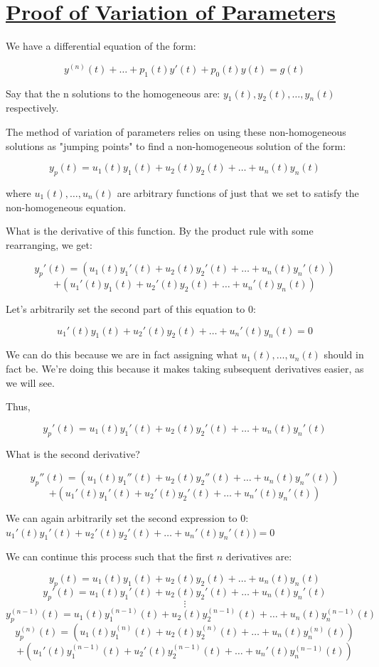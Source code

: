 \documentclass{report}
\begin{document}
{\section{\hyperref[th:var]{Proof of Variation of Parameters}}
\label{sec:prVar}
We have a differential equation of the form:

$$y^{(n)}(t) + \dots + p_1(t)y'(t) + p_0(t)y(t) = g(t)$$

Say that the n solutions to the homogeneous are:
$y_1(t), y_2(t), \dots, y_n(t)$ respectively.

The method of variation of parameters relies on using these non-homogeneous solutions as "jumping points" to find a non-homogeneous solution of the form:

$$y_p(t) = u_1(t)y_1(t) + u_2(t)y_2(t) + \dots + u_n(t)y_n(t)$$

where $u_1(t), \dots, u_n(t)$ are arbitrary functions of just that we set to satisfy the non-homogeneous equation.

What is the derivative of this function. By the product rule with some rearranging, we get:

$$y_p'(t) = (u_1(t)y_1'(t) + u_2(t)y_2'(t) + \dots
+ u_n(t)y_n'(t)) $$  $$+ (u_1'(t)y_1(t) + u_2'(t)y_2(t) + \dots + u_n'(t)y_n(t))$$

Let's arbitrarily set the second part of this equation to 0:

$$u_1'(t)y_1(t) + u_2'(t)y_2(t) + \dots + u_n'(t)y_n(t) = 0$$

We can do this because we are in fact assigning what $u_1(t), \dots, u_n(t)$ should in fact be. We're doing this because it makes taking subsequent derivatives easier, as we will see.

Thus,

$$y_p'(t) = u_1(t)y_1'(t) + u_2(t)y_2'(t) + \dots + u_n(t)y_n'(t)$$

What is the second derivative?

$$y_p''(t) = (u_1(t)y_1''(t) + u_2(t)y_2''(t) + \dots + u_n(t)y_n''(t))$$ 
$$ +  (u_1'(t)y_1'(t) + u_2'(t)y_2'(t) + \dots + u_n'(t)y_n'(t))$$

We can again arbitrarily set the second expression to 0:
$u_1'(t)y_1'(t) + u_2'(t)y_2'(t) + \dots + u_n'(t)y_n'(t)) = 0$

We can continue this process such that the first $n$ derivatives are:

$$y_p(t) = u_1(t)y_1(t) + u_2(t)y_2(t) + \dots + u_n(t)y_n(t)$$
$$y_p'(t) = u_1(t)y_1'(t) + u_2(t)y_2'(t) + \dots + u_n(t)y_n'(t)$$
$$\vdots$$
$$y_p^{(n-1)}(t) = u_1(t)y_1^{(n-1)}(t) + u_2(t)y_2^{(n-1)}(t) + \dots + u_n(t)y_n^{(n-1)}(t)$$
$$y_p^{(n)}(t) = (u_1(t)y_1^{(n)}(t) + u_2(t)y_2^{(n)}(t) + \dots + u_n(t)y_n^{(n)}(t))$$
$$+ (u_1'(t)y_1^{(n-1)}(t) + u_2'(t)y_2^{(n-1)}(t) + \dots + u_n'(t)y_n^{(n-1)}(t))$$

}
\end{document}
